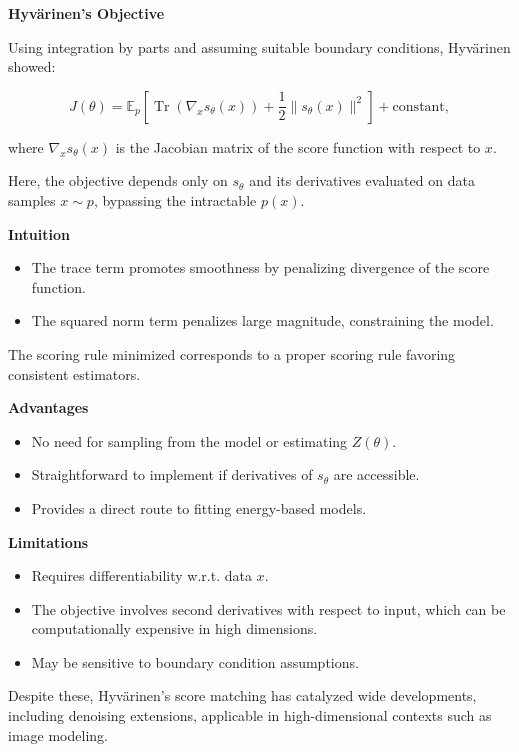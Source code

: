 \textbf{Hyvärinen's Objective}

Using integration by parts and assuming suitable boundary conditions, Hyvärinen showed:

\[
J(\theta) = \mathbb{E}_{p} \left[ \operatorname{Tr} \left( \nabla_x s_\theta(x) \right) + \frac{1}{2} \| s_\theta(x) \|^2 \right] + \text{constant},
\]

where \( \nabla_x s_\theta(x) \) is the Jacobian matrix of the score function with respect to \( x \).

Here, the objective depends only on \( s_\theta \) and its derivatives evaluated on data samples \( x \sim p \), bypassing the intractable \( p(x) \).

\textbf{Intuition}

\begin{itemize}
    \item The trace term promotes smoothness by penalizing divergence of the score function.
    \item The squared norm term penalizes large magnitude, constraining the model.
\end{itemize}

The scoring rule minimized corresponds to a proper scoring rule favoring consistent estimators.

\textbf{Advantages}

\begin{itemize}
    \item No need for sampling from the model or estimating \( Z(\theta) \).
    \item Straightforward to implement if derivatives of \( s_\theta \) are accessible.
    \item Provides a direct route to fitting energy-based models.
\end{itemize}

\textbf{Limitations}

\begin{itemize}
    \item Requires differentiability w.r.t. data \( x \).
    \item The objective involves second derivatives with respect to input, which can be computationally expensive in high dimensions.
    \item May be sensitive to boundary condition assumptions.
\end{itemize}

Despite these, Hyvärinen’s score matching has catalyzed wide developments, including denoising extensions, applicable in high-dimensional contexts such as image modeling.

